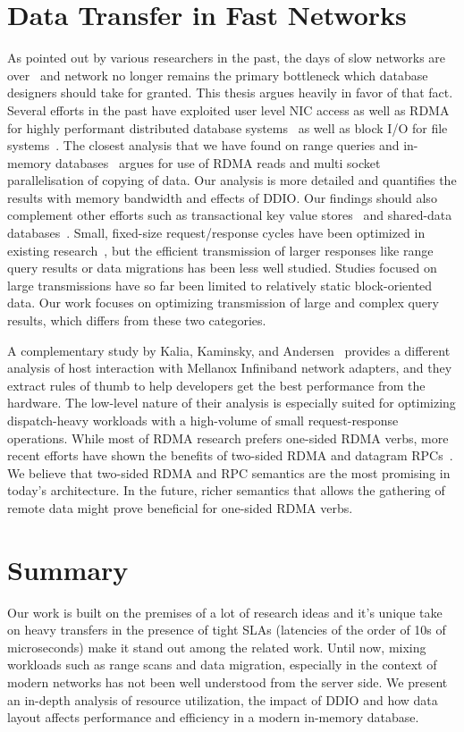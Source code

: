 \section{Data Transfer in Fast Networks}
As pointed out by various researchers in the past, the days of slow networks are over~\cite{slow} 
and network no longer remains the primary bottleneck which database designers should take for granted.
This thesis argues heavily in favor of that fact. Several efforts in the past have exploited
user level NIC access as well as RDMA for highly performant distributed database systems~\cite{ramcloud,farm,farmtx,drtm,hyper}
as well as block I/O for file systems~\cite{rdmagfs}. The closest analysis that we have found on 
range queries and in-memory databases~\cite{zerocopyrangequery} argues for use of RDMA reads and 
multi socket parallelisation of copying of data. Our analysis is more detailed and quantifies the 
results with memory bandwidth and effects of DDIO.
Our findings should also complement other efforts such as transactional key value stores~\cite{deuteronomy} 
and shared-data databases~\cite{tell}. Small, fixed-size request/response cycles have been optimized in
existing research~\cite{farm,herd,mica,rdma,ramcloud}, but the efficient
transmission of larger responses like range query results or data
migrations has been less well studied. Studies focused on large transmissions
have so far been limited to relatively static block-oriented data.
Our work focuses on optimizing transmission of large and complex query
results, which differs from these two categories. 

A complementary study by Kalia, Kaminsky, and Andersen~\cite{rdma} provides a
different analysis of host interaction with Mellanox Infiniband network adapters,
and they extract rules of thumb to help developers get the best performance from the hardware.
The low-level nature of their analysis is especially suited for
optimizing dispatch-heavy workloads with a high-volume of small
request-response operations. While most of RDMA research prefers one-sided RDMA verbs, more recent efforts have shown 
the benefits of two-sided RDMA and datagram RPCs~\cite{fasst}. We believe that 
two-sided RDMA and RPC semantics are the most promising in today's architecture. In the future, 
richer semantics that allows the gathering of remote data might prove beneficial for one-sided RDMA verbs.


\section{Summary}
Our work is built on the premises of a lot of research ideas and it's unique take on
heavy transfers in the presence of tight SLAs (latencies of the order of 10s of microseconds)
make it stand out among the related work. Until now, mixing workloads such as range scans 
and data migration, especially in the context of modern networks has not been well
 understood from the server side. We present an in-depth analysis of resource utilization, 
 the impact of DDIO and how data layout affects performance and efficiency in a modern 
 in-memory database.
